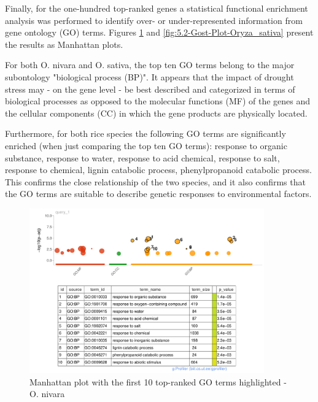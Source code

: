 Finally, for the one-hundred top-ranked genes a statistical functional enrichment analysis was performed to identify over- or under-represented information from gene ontology (GO) terms. Figures \ref{fig:5.2-Gost-Plot-Oryza_nivara} and \ref{fig:5.2-Gost-Plot-Oryza_sativa} present the results as Manhattan plots.

For both O. nivara and O. sativa, the top ten GO terms belong to the major subontology "biological process (BP)". It appears that the impact of drought stress may - on the gene level - be best described and categorized in terms of biological processes as opposed to the molecular functions (MF) of the genes and the cellular components (CC) in which the gene products are physically located.

Furthermore, for both rice species the following GO terms are significantly enriched (when just comparing the top ten GO terms): response to organic substance, response to water, response to acid chemical, response to salt, response to chemical, lignin catabolic process, phenylpropanoid catabolic process. This confirms the close relationship of the two species, and it also confirms that the GO terms are suitable to describe genetic responses to environmental factors.

\begin{figure}[htbp]
    \caption{Manhattan plot with the first 10 top-ranked GO terms highlighted - O. nivara}
    \label{fig:5.2-Gost-Plot-Oryza_nivara}
    \includegraphics[width=0.9\textwidth]{../../results/plots-and-tables/5.2-Gost-Plot-Oryza_nivara}
\end{figure}

